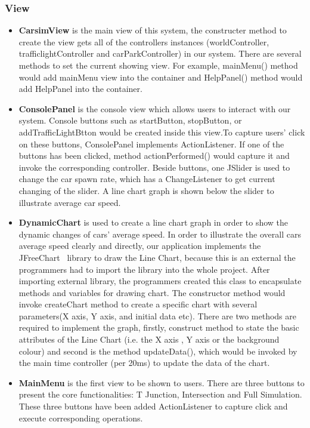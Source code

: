 \documentclass[11pt]{article}
\begin{document}
\subsubsection{View}        
\begin{itemize}[noitemsep]
\item \textbf{CarsimView} is the main view of this system, the constructer method to create the view gets all of the controllers instances (worldController, trafficlightController and carParkController) in our system. There are several methods to set the current showing view. For example, mainMenu() method would add mainMenu view into the container and HelpPanel() method would add HelpPanel into the container. 
 
\item \textbf{ConsolePanel} is the console view which allows users to interact with our system. Console buttons such as startButton, stopButton, or addTrafficLightBtton would be created inside this view.To capture users' click on these buttons, ConsolePanel implements ActionListener. If one of the buttons has been clicked, method actionPerformed() would capture it and invoke the corresponding controller. Beside buttons, one JSlider is used to change the car spawn rate, which has a ChangeListener to get current changing of the slider. A line chart graph is shown below the slider to illustrate average car speed.  
 
\item \textbf{DynamicChart} is used to create a line chart graph in order to show the dynamic changes of cars' average speed. In order to illustrate the overall cars average speed clearly and directly, our application implements the JFreeChart~\cite{FreeChart} library to draw the Line Chart, because this is an external the programmers had to import the library into the whole project. After importing external library, the programmers created this class to encapsulate methods and variables for drawing chart. The constructor method would  invoke createChart method to create a specific chart with several parameters(X axis, Y axis, and initial data etc). 
There are two methods are required to implement the graph, firstly, construct method to state the basic attributes of the Line Chart (i.e. the X axis , Y axis or the background colour) and second is the method updateData(), which would be invoked by the main time controller (per 20ms) to update the data of the chart.
 
\item \textbf{MainMenu} is the first view to be shown to users. There are three buttons to present the core functionalities: T Junction, Intersection and Full Simulation. These three buttons have been added ActionListener to capture click and execute corresponding operations. 
 

\end{itemize}
\end{document}
